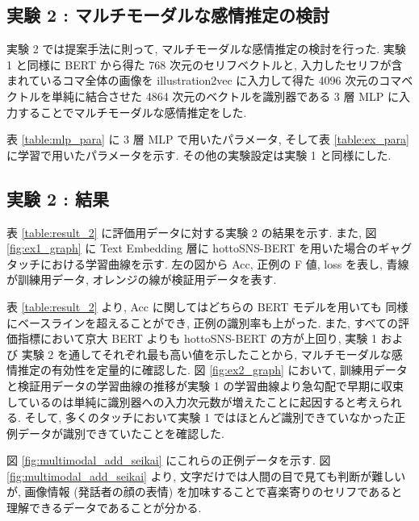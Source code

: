 \newpage
\changeindent{0cm}
\subsection{実験 2 : マルチモーダルな感情推定の検討}
\changeindent{2cm}

実験 2 では提案手法に則って, マルチモーダルな感情推定の検討を行った.
実験 1 と同様に BERT から得た 768 次元のセリフベクトルと, 入力したセリフが含まれているコマ全体の画像を illustration2vec に入力して得た 4096 次元のコマベクトルを単純に結合させた 4864 次元のベクトルを識別器である 3 層 MLP に入力することでマルチモーダルな感情推定をした.

表 \ref{table:mlp_para} に 3 層 MLP で用いたパラメータ, そして表 \ref{table:ex_para} に学習で用いたパラメータを示す. その他の実験設定は実験 1 と同様にした.


\changeindent{0cm}
\subsection{実験 2 : 結果}
\changeindent{2cm}

表 \ref{table:result_2} に評価用データに対する実験 2 の結果を示す. また, 図 \ref{fig:ex1_graph} に Text Embedding 層に hottoSNS-BERT を用いた場合のギャグタッチにおける学習曲線を示す. 左の図から Acc, 正例の F 値, loss を表し, 青線が訓練用データ, オレンジの線が検証用データを表す.

表 \ref{table:result_2} より, Acc に関してはどちらの BERT モデルを用いても
同様にベースラインを超えることができ, 正例の識別率も上がった. また, すべての評価指標において京大 BERT よりも hottoSNS-BERT の方が上回り, 実験 1 および 実験 2 を通してそれぞれ最も高い値を示したことから, マルチモーダルな感情推定の有効性を定量的に確認した. 図 \ref{fig:ex2_graph} において, 訓練用データと検証用データの学習曲線の推移が実験 1 の学習曲線より急勾配で早期に収束しているのは単純に識別器への入力次元数が増えたことに起因すると考えられる. そして, 多くのタッチにおいて実験 1 ではほとんど識別できていなかった正例データが識別できていたことを確認した.

図 \ref{fig:multimodal_add_seikai} にこれらの正例データを示す. 図 \ref{fig:multimodal_add_seikai} より, 文字だけでは人間の目で見ても判断が難しいが, 画像情報 (発話者の顔の表情) を加味することで喜楽寄りのセリフであると理解できるデータであることが分かる.

\newpage

